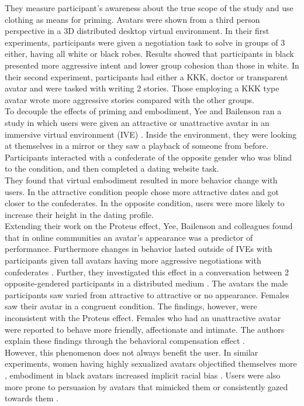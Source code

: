 They measure participant’s awareness about the true scope of the study and use clothing as means for priming. Avatars were shown from a third person perspective in a 3D distributed desktop virtual environment. In their first experiments, participants were given a negotiation task to solve in groups of 3 either, having all white or black robes. Results showed that participants in black presented more aggressive intent and lower group cohesion than those in white. In their second experiment, participants had either a KKK, doctor or transparent avatar and were tasked with writing 2 stories. Those employing a KKK type avatar wrote more aggressive stories compared with the other groups.\\
To decouple the effects of priming and embodiment, Yee and Bailenson ran a study in which users were given an attractive or unattractive avatar in an immersive virtual environment (IVE) \cite{yee2009difference}. Inside the environment, they were looking at themselves in a mirror or they saw a playback of someone from before. Participants interacted with a confederate of the opposite gender who was blind to the condition, and then completed a dating website task.\\
They found that virtual embodiment resulted in more behavior change with users. In the attractive condition people chose more attractive dates and got closer to the confederates. In the opposite condition, users were more likely to increase their height in the dating profile.\\
Extending their work on the Proteus effect, Yee, Bailenson and colleagues found that in online communities an avatar’s appearance was a predictor of performance. 
Furthermore changes in behavior lasted outside of IVEs with participants given tall avatars having more aggressive negotiations with confederates \cite{yee2009proteus}. Further, they investigated this effect in a conversation between 2 opposite-gendered participants in a distributed medium \cite{van2013proteus}. The avatars the male participants saw varied from attractive to attractive or no appearance. Females saw their avatar in a congruent condition.
The findings, however, were inconsistent with the Proteus effect. Females who had an unattractive avatar were reported to behave more friendly, affectionate and intimate. The authors explain these findings through the behavioral compensation effect \cite{bond1972effect}.\\
However, this phenomenon does not always benefit the user. In similar experiments, women having highly sexualized avatars objectified themselves more \cite{fox2013embodiment}, embodiment in black avatars increased implicit racial bias \cite{groom2009influence}. Users were also more prone to persuasion by avatars that mimicked them \cite{bailenson2006transformed} or consistently gazed towards them \cite{bailenson2005digital}. 
